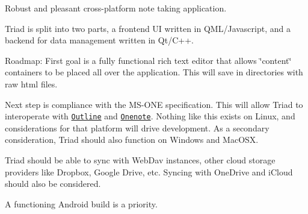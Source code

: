 Robust and pleasant cross-\/platform note taking application.

Triad is split into two parts, a frontend UI written in Q\+M\+L/\+Javascript, and a backend for data management written in Qt/\+C++.

Roadmap\+: First goal is a fully functional rich text editor that allows \char`\"{}content\char`\"{} containers to be placed all over the application. This will save in directories with raw html files.

Next step is compliance with the M\+S-\/\+O\+NE specification. This will allow Triad to interoperate with \href{outline.ws}{\tt Outline} and \href{onenote.com}{\tt Onenote}. Nothing like this exists on Linux, and considerations for that platform will drive development. As a secondary consideration, Triad should also function on Windows and Mac\+O\+SX.

Triad should be able to sync with Web\+Dav instances, other cloud storage providers like Dropbox, Google Drive, etc. Syncing with One\+Drive and i\+Cloud should also be considered.

A functioning Android build is a priority. 